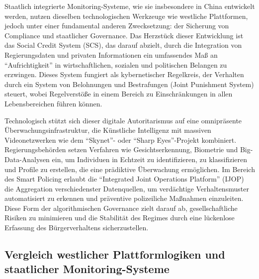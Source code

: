 Staatlich integrierte Monitoring-Systeme, wie sie insbesondere in China entwickelt werden, nutzen dieselben technologischen Werkzeuge wie westliche Plattformen, jedoch unter einer fundamental anderen Zwecksetzung: der Sicherung von Compliance und staatlicher Governance. Das Herzstück dieser Entwicklung ist das Social Credit System (\ac{SCS}), das darauf abzielt, durch die Integration von Regierungsdaten und privaten Informationen ein umfassendes Maß an \enquote{Aufrichtigkeit} in wirtschaftlichen, sozialen und politischen Belangen zu erzwingen. Dieses System fungiert als kybernetischer Regelkreis, der Verhalten durch ein System von Belohnungen und Bestrafungen (Joint Punishment System) steuert, wobei Regelverstöße in einem Bereich zu Einschränkungen in allen Lebensbereichen führen können.

Technologisch stützt sich dieser digitale Autoritarismus auf eine omnipräsente Überwachungsinfrastruktur, die Künstliche Intelligenz mit massiven Videonetzwerken wie dem \enquote{Skynet}- oder \enquote{Sharp Eyes}-Projekt kombiniert. Regierungsbehörden setzen Verfahren wie Gesichtserkennung, Biometrie und Big-Data-Analysen ein, um Individuen in Echtzeit zu identifizieren, zu klassifizieren und Profile zu erstellen, die eine prädiktive Überwachung ermöglichen. Im Bereich des Smart Policing erlaubt die \enquote{Integrated Joint Operations Platform} (IJOP) die Aggregation verschiedenster Datenquellen, um verdächtige Verhaltensmuster automatisiert zu erkennen und präventive polizeiliche Maßnahmen einzuleiten. Diese Form der algorithmischen Governance zielt darauf ab, gesellschaftliche Risiken zu minimieren und die Stabilität des Regimes durch eine lückenlose Erfassung des Bürgerverhaltens sicherzustellen.

\subsection{Vergleich westlicher Plattformlogiken und staatlicher Monitoring-Systeme}

